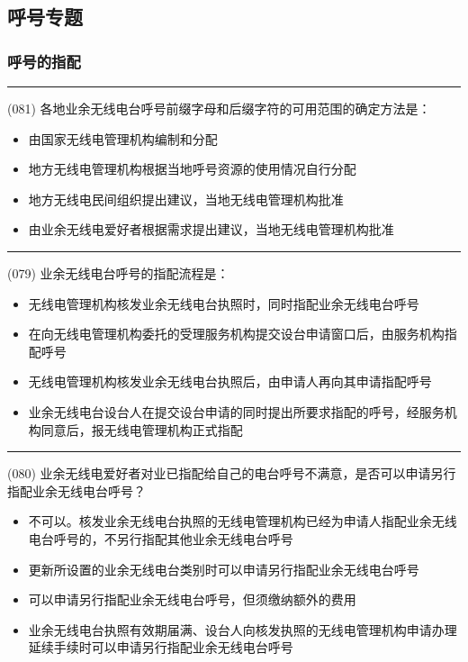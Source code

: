 \documentclass[twocolumn,hyperref,UTF8]{ctexart}  %
\begin{document}
\clearpage
\subsection{呼号专题}


\subsubsection{呼号的指配}


\noindent\rule{0.5\textwidth}{1pt}
\heiti (081) 各地业余无线电台呼号前缀字母和后缀字符的可用范围的确定方法是： \songti {\color{gray} [LK0082] }
\begin{itemize}
	\item  由国家无线电管理机构编制和分配
	\item  地方无线电管理机构根据当地呼号资源的使用情况自行分配
	\item  地方无线电民间组织提出建议，当地无线电管理机构批准
	\item  由业余无线电爱好者根据需求提出建议，当地无线电管理机构批准
\end{itemize}


\noindent\rule{0.5\textwidth}{1pt}
\heiti (079) 业余无线电台呼号的指配流程是： \songti {\color{gray} [LK0080] }
\begin{itemize}
	\item  无线电管理机构核发业余无线电台执照时，同时指配业余无线电台呼号
	\item  在向无线电管理机构委托的受理服务机构提交设台申请窗口后，由服务机构指配呼号
	\item  无线电管理机构核发业余无线电台执照后，由申请人再向其申请指配呼号
	\item  业余无线电台设台人在提交设台申请的同时提出所要求指配的呼号，经服务机构同意后，报无线电管理机构正式指配
\end{itemize}


\noindent\rule{0.5\textwidth}{1pt}
\heiti (080) 业余无线电爱好者对业已指配给自己的电台呼号不满意，是否可以申请另行指配业余无线电台呼号？ \songti {\color{gray} [LK0081] }
\begin{itemize}
	\item  不可以。核发业余无线电台执照的无线电管理机构已经为申请人指配业余无线电台呼号的，不另行指配其他业余无线电台呼号
	\item  更新所设置的业余无线电台类别时可以申请另行指配业余无线电台呼号
	\item  可以申请另行指配业余无线电台呼号，但须缴纳额外的费用
	\item  业余无线电台执照有效期届满、设台人向核发执照的无线电管理机构申请办理延续手续时可以申请另行指配业余无线电台呼号
\end{itemize}
\end{document}
